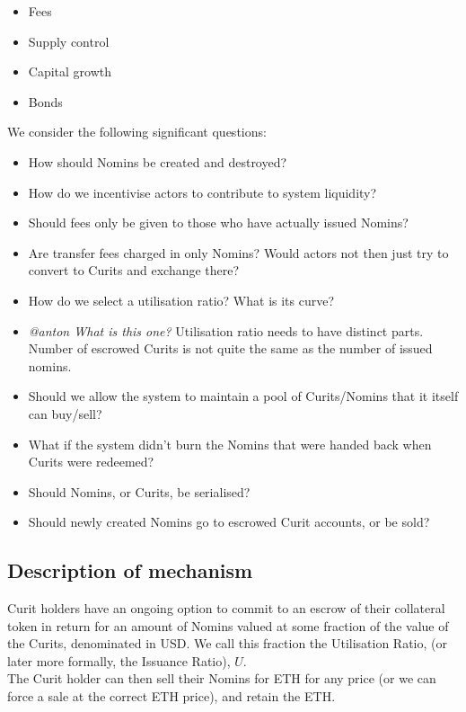 \documentclass{article}
\begin{document}
\begin{itemize}
	\item Fees
	\item Supply control
	\item Capital growth
	\item Bonds
\end{itemize}

\noindent We consider the following significant questions:

\begin{itemize}
    \item How should Nomins be created and destroyed?
    \item How do we incentivise actors to contribute to system liquidity?
    \item Should fees only be given to those who have actually issued Nomins?
    \item Are transfer fees charged in only Nomins? Would actors not then just try to convert to Curits and exchange there?
    \item How do we select a utilisation ratio? What is its curve?
    \item \textit{@anton What is this one?} Utilisation ratio needs to have distinct parts. Number of escrowed Curits is not quite the same as the number of issued nomins.
    \item Should we allow the system to maintain a pool of Curits/Nomins that it itself can buy/sell?
    \item What if the system didn't burn the Nomins that were handed back when Curits were redeemed?
    \item Should Nomins, or Curits, be serialised?
    \item Should newly created Nomins go to escrowed Curit accounts, or be sold?
\end{itemize}

\subsection{Description of mechanism}

Curit holders have an ongoing option to commit to an escrow of their collateral token in return for an amount of Nomins valued at some fraction of the value of the Curits, denominated in USD. We call this fraction the Utilisation Ratio, (or later more formally, the Issuance Ratio), $ U $. \\

\noindent The Curit holder can then sell their Nomins for ETH for any price (or we can force a sale at the correct ETH price), and retain the ETH.
\end{document}
